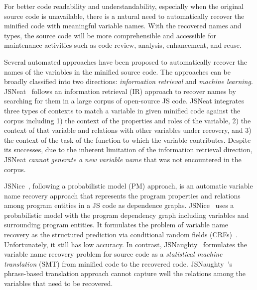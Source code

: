 For better code readability and understandability, especially when the
original source code is unavailable, there is a natural need to
automatically recover the minified code with meaningful variable
names. With the recovered names and types, the source code will be
more comprehensible and accessible for maintenance activities such
as code review, analysis, enhancement, and reuse.




Several automated approaches have been proposed to automatically
recover the names of the variables in the minified source code.  The
approaches can be broadly classified into two directions: {\em
information retrieval} and {\em machine learning}.
JSNeat~\cite{icse19} follows an information retrieval (IR) approach to
recover names by searching for them in a large corpus of open-source
JS code. JSNeat integrates three types of contexts to match a variable
in given minified code against the corpus including 1) the context of
the properties and roles of the variable, 2) the context of that
variable and relations with other variables under recovery, and 3) the
context of the task of the function to which the variable contributes.
Despite its successes, due to the inherent limitation of the
information retrieval direction, JSNeat {\em cannot generate a new
variable name} that was not encountered in the corpus.

JSNice~\cite{JSNice2015}, following a probabilistic model (PM)
approach, is an automatic variable name recovery approach that
represents the program properties and relations among program entities
in a JS code as dependence graphs. JSNice~\cite{JSNice2015} uses a
probabilistic model with the program dependency graph including
variables and surrounding program entities. It formulates the problem
of variable name recovery as the structured prediction via conditional
random fields (CRFs)~\cite{JSNice2015}. Unfortunately, it still has
low accuracy.
%
In contrast, JSNaughty~\cite{JSNaughty2017} formulates the variable
name recovery problem for source code as a {\em statistical machine
translation} (SMT) from minified code to the recovered
code. JSNaughty~\cite{JSNaughty2017}'s phrase-based translation
approach cannot capture well the relations among the variables that
need to be recovered.

